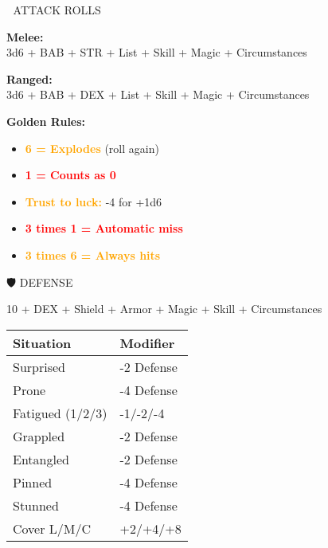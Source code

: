 \documentclass[10pt,a4paper,landscape]{article}
\newcommand{\highlight}[1]{\textcolor{orange}{\textbf{#1}}}
\newcommand{\critical}[1]{\textcolor{red}{\textbf{#1}}}
\begin{document}
\begin{multicols}{4}
		\begin{mainsection}{🎯 ATTACK ROLLS}
			\begin{formula}
				\textbf{Melee:}\\
				3d6 + BAB + STR + List + Skill + Magic + Circumstances
			\end{formula}

			\begin{formula}
				\textbf{Ranged:}\\
				3d6 + BAB + DEX + List + Skill + Magic + Circumstances
			\end{formula}

			\textbf{Golden Rules:}
			\begin{itemize}[noitemsep,leftmargin=8pt]
				\item \highlight{6 = Explodes} (roll again)
				\item \critical{1 = Counts as 0}
				\item \highlight{Trust to luck:} -4 for +1d6
				\item \critical{3 times 1 = Automatic miss}
				\item \highlight{3 times 6 = Always hits}
			\end{itemize}
		\end{mainsection}

		\begin{mainsection}{🛡️ DEFENSE}
			\begin{formula}
				10 + DEX + Shield + Armor + Magic + Skill + Circumstances
			\end{formula}

			\begin{tabular}{@{}ll@{}}
				\toprule
				\textbf{Situation} & \textbf{Modifier} \\
				\midrule
				Surprised & -2 Defense \\
				Prone & -4 Defense \\
				Fatigued (1/2/3) & -1/-2/-4 \\
				Grappled & -2 Defense \\
				Entangled & -2 Defense \\
				Pinned & -4 Defense \\
				Stunned & -4 Defense \\
				Cover L/M/C & +2/+4/+8 \\
				\bottomrule
			\end{tabular}
		\end{mainsection}

		\columnbreak


\end{multicols}
\end{document}
